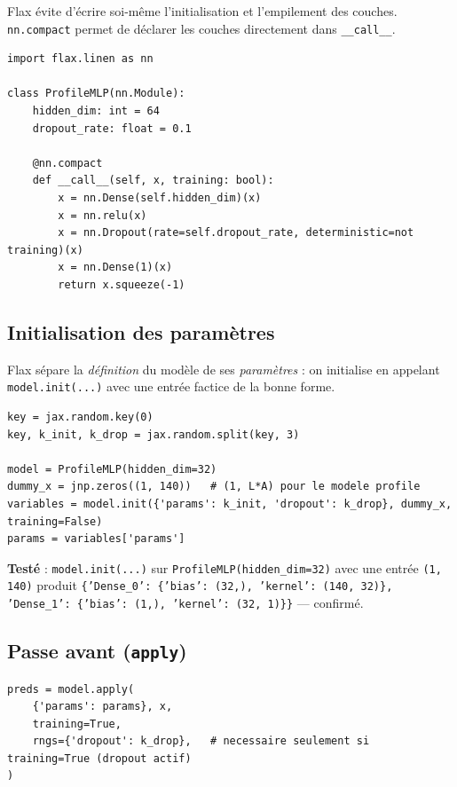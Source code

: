 \documentclass[11pt,a4paper]{article}
\begin{document}
Flax évite d'écrire soi-même l'initialisation et l'empilement des couches.
\texttt{nn.compact} permet de déclarer les couches directement dans
\texttt{\_\_call\_\_}.

\begin{lstlisting}
import flax.linen as nn

class ProfileMLP(nn.Module):
    hidden_dim: int = 64
    dropout_rate: float = 0.1

    @nn.compact
    def __call__(self, x, training: bool):
        x = nn.Dense(self.hidden_dim)(x)
        x = nn.relu(x)
        x = nn.Dropout(rate=self.dropout_rate, deterministic=not training)(x)
        x = nn.Dense(1)(x)
        return x.squeeze(-1)
\end{lstlisting}

\subsection{Initialisation des paramètres}
Flax sépare la \emph{définition} du modèle de ses \emph{paramètres} : on
initialise en appelant \texttt{model.init(...)} avec une entrée factice de la
bonne forme.

\begin{lstlisting}
key = jax.random.key(0)
key, k_init, k_drop = jax.random.split(key, 3)

model = ProfileMLP(hidden_dim=32)
dummy_x = jnp.zeros((1, 140))   # (1, L*A) pour le modele profile
variables = model.init({'params': k_init, 'dropout': k_drop}, dummy_x, training=False)
params = variables['params']
\end{lstlisting}

\begin{mdframed}
\textbf{Testé} : \texttt{model.init(...)} sur \texttt{ProfileMLP(hidden\_dim=32)}
avec une entrée \texttt{(1, 140)} produit
\texttt{\{'Dense\_0': \{'bias': (32,), 'kernel': (140, 32)\}, 'Dense\_1': \{'bias': (1,), 'kernel': (32, 1)\}\}}
--- confirmé.
\end{mdframed}

\subsection{Passe avant (\texttt{apply})}
\begin{lstlisting}
preds = model.apply(
    {'params': params}, x,
    training=True,
    rngs={'dropout': k_drop},   # necessaire seulement si training=True (dropout actif)
)
\end{lstlisting}
\end{document}
